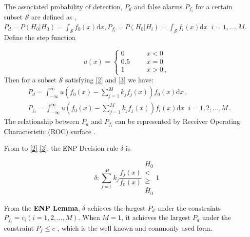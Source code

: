 \documentclass[12pt,journal,a4paper,twoside,onecolumn]{IEEEtran}
\begin{document}
\begin{spacing}{2.5}
The associated probability of detection, $P_d$ and false alarms $P_{f_i}$ for a certain subset $\mathcal{S}$ are defined as \cite{neyman1933problem}, $P_d = P(H_0 | H_0) = \int_{\mathcal{S}}f_0(x)\mathrm{d}x, P_{f_i} = P(H_0 | H_i) = \int_{\mathcal{S}}f_i(x)\mathrm{d}x\;\; i = 1, ..., M $. Define the step function

\begin{equation}
   \label{equ: step function}
   u(x) = \begin{cases}
     0\;\;\;\;\;\;&x < 0\\
     0.5\;\;\;\;\;\;&x=0\\
     1\;\;\;\;\;\;&x>0\,,
   \end{cases}
\end{equation}
Then for a subset $\mathcal{S}$ satisfying \eqref{2} and \eqref{3} we have:
\begin{equation}
\label{equ: pf and pd}
\begin{split}
&P_d = \int_{-\infty}^{\infty} u(f_0(x) - \sum_{j=1}^{M}k_jf_j(x)) f_0(x)\mathrm{d}x	\,, \\
&P_{f_i} = \int_{-\infty}^{\infty} u(f_0(x) - \sum_{j=1}^{M}k_jf_j(x)) f_i(x) \mathrm{d}x\;\;	 i=1, 2, ..., M\,.
\end{split}
\end{equation}
The relationship between $P_d$ and $P_{f_i}$ can be represented by Receiver Operating Characteristic (ROC) surface \cite{LehmannTest}.

From to \eqref{2} \eqref{3}, the ENP Decision rule $\delta$ is

\begin{equation}
\label{equ: decision rule}
\delta: \sum_{j=1}^{M}k_j\frac{f_j(x)}{f_0(x)} \substack{H_0 \\ < \\ \geq \\ \bar{H}_0} 1
\end{equation}

From the  \textbf{ENP Lemma}, $\delta$  achieves the largest $P_d$ under the constraints $P_{f_i} = c_i (i = 1, 2, ..., M)$.
When $M=1$, it achieves the largest $P_d$ under the constraint $P_f \leq c$ \cite{LehmannTest}, which is the well known and commonly used form.


\end{spacing}
\end{document}
